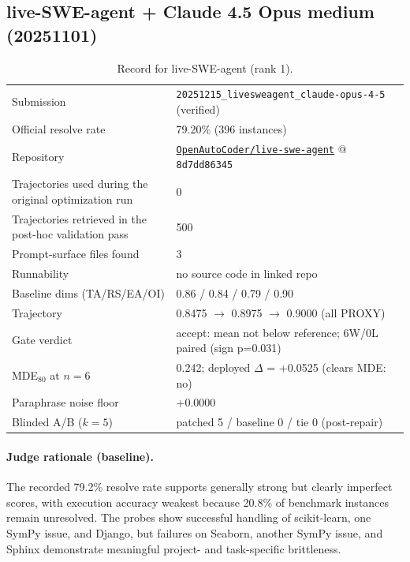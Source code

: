 \subsection{live-SWE-agent + Claude 4.5 Opus medium (20251101)}
\label{app:agent1}
\begin{table}[H]\centering\scriptsize
\caption{Record for live-SWE-agent (rank 1).}
\begin{tabular}{lp{8.2cm}}\toprule
Submission & \texttt{20251215\_\allowbreak{}livesweagent\_\allowbreak{}claude-opus-4-5} (verified) \\
Official resolve rate & 79.20\% (396 instances) \\
Repository & \href{https://github.com/OpenAutoCoder/live-swe-agent}{\texttt{OpenAutoCoder/live-swe-agent}} @ \texttt{8d7dd86345} \\
Trajectories used during the original optimization run & 0 \\
Trajectories retrieved in the post-hoc validation pass & 500 \\
Prompt-surface files found & 3 \\
Runnability & no source code in linked repo \\
Baseline dims (TA/RS/EA/OI) & 0.86 / 0.84 / 0.79 / 0.90 \\
Trajectory & 0.8475 $\to$ 0.8975 $\to$ 0.9000 (all PROXY) \\
Gate verdict & accept: mean not below reference; 6W/0L paired (sign p=0.031) \\
MDE$_{80}$ at $n{=}6$ & 0.242; deployed $\Delta$ = +0.0525 (clears MDE: no) \\
Paraphrase noise floor & +0.0000 \\
Blinded A/B ($k{=}5$) & patched 5 / baseline 0 / tie 0 (post-repair) \\
\bottomrule\end{tabular}\end{table}
\paragraph{Judge rationale (baseline).}
The recorded 79.2\% resolve rate supports generally strong but clearly imperfect scores, with execution accuracy weakest because 20.8\% of benchmark instances remain unresolved. The probes show successful handling of scikit-learn, one SymPy issue, and Django, but failures on Seaborn, another SymPy issue, and Sphinx demonstrate meaningful project- and task-specific brittleness.
